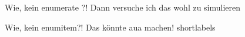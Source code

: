 

                    {Wie, kein enumerate ?! Dann versuche ich das wohl zu simulieren}
                    {} 
                    {}{}


                    {Wie, kein enumitem?! Das könnte aua machen!}
                    {} 
                    {shortlabels}{\newenvironment{enumeratea}[1][,]{\begin{enumerate}[label=\alph*),#1]}{\end{enumerate}}}





